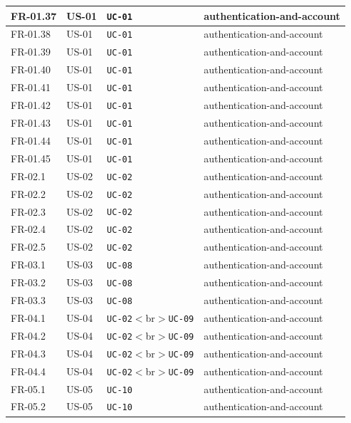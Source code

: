\documentclass[12pt]{article}
\begin{document}
\begin{longtable}{|>{\raggedright\arraybackslash}p{}|>{\raggedright\arraybackslash}p{}|>{\raggedright\arraybackslash}p{}|>{\raggedright\arraybackslash}p{}|}
FR-01.37 & US-01 & \texttt{UC-01} & authentication-and-account \\ \hline
FR-01.38 & US-01 & \texttt{UC-01} & authentication-and-account \\ \hline
FR-01.39 & US-01 & \texttt{UC-01} & authentication-and-account \\ \hline
FR-01.40 & US-01 & \texttt{UC-01} & authentication-and-account \\ \hline
FR-01.41 & US-01 & \texttt{UC-01} & authentication-and-account \\ \hline
FR-01.42 & US-01 & \texttt{UC-01} & authentication-and-account \\ \hline
FR-01.43 & US-01 & \texttt{UC-01} & authentication-and-account \\ \hline
FR-01.44 & US-01 & \texttt{UC-01} & authentication-and-account \\ \hline
FR-01.45 & US-01 & \texttt{UC-01} & authentication-and-account \\ \hline
FR-02.1 & US-02 & \texttt{UC-02} & authentication-and-account \\ \hline
FR-02.2 & US-02 & \texttt{UC-02} & authentication-and-account \\ \hline
FR-02.3 & US-02 & \texttt{UC-02} & authentication-and-account \\ \hline
FR-02.4 & US-02 & \texttt{UC-02} & authentication-and-account \\ \hline
FR-02.5 & US-02 & \texttt{UC-02} & authentication-and-account \\ \hline
FR-03.1 & US-03 & \texttt{UC-08} & authentication-and-account \\ \hline
FR-03.2 & US-03 & \texttt{UC-08} & authentication-and-account \\ \hline
FR-03.3 & US-03 & \texttt{UC-08} & authentication-and-account \\ \hline
FR-04.1 & US-04 & \texttt{UC-02}$<$br$>$\texttt{UC-09} & authentication-and-account \\ \hline
FR-04.2 & US-04 & \texttt{UC-02}$<$br$>$\texttt{UC-09} & authentication-and-account \\ \hline
FR-04.3 & US-04 & \texttt{UC-02}$<$br$>$\texttt{UC-09} & authentication-and-account \\ \hline
FR-04.4 & US-04 & \texttt{UC-02}$<$br$>$\texttt{UC-09} & authentication-and-account \\ \hline
FR-05.1 & US-05 & \texttt{UC-10} & authentication-and-account \\ \hline
FR-05.2 & US-05 & \texttt{UC-10} & authentication-and-account \\ \hline

\end{longtable}
\end{document}
